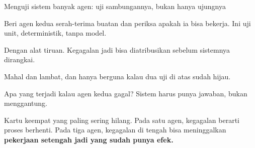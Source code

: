 \documentclass[aspectratio=169,11pt,t]{beamer}
\begin{document}
\begin{frame}[shrink=25]{Menguji sistem banyak agen: uji sambungannya, bukan hanya ujungnya}
\begin{minipage}[t]{0.494\textwidth}
\begin{icardgood}
Beri agen kedua serah-terima buatan dan periksa apakah ia bisa bekerja. Ini uji unit, deterministik, tanpa model.
\end{icardgood}
\end{minipage}%
\hfill
\begin{minipage}[t]{0.494\textwidth}
\begin{icardgood}
Dengan alat tiruan. Kegagalan jadi bisa diatribusikan sebelum sistemnya dirangkai.
\end{icardgood}
\end{minipage}%


\vskip 4pt

\begin{minipage}[t]{0.494\textwidth}
\begin{icard}
Mahal dan lambat, dan hanya berguna kalau dua uji di atas sudah hijau.
\end{icard}
\end{minipage}%
\hfill
\begin{minipage}[t]{0.494\textwidth}
\begin{icard}
Apa yang terjadi kalau agen kedua gagal? Sistem harus punya jawaban, bukan menggantung.
\end{icard}
\end{minipage}%
{\fontsize{9.4}{12.6}\selectfont\color{fg2}Kartu keempat yang paling sering hilang. Pada satu agen, kegagalan berarti proses berhenti. Pada tiga agen, kegagalan di tengah bisa meninggalkan \textbf{pekerjaan setengah jadi yang sudah punya efek.}\par}\vskip 4pt
\end{frame}
\end{document}
